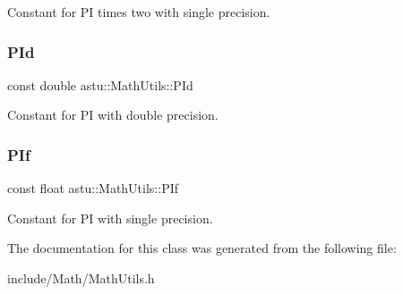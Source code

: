 Constant for PI times two with single precision. \mbox{\label{classastu_1_1MathUtils_a333f618d0f2a07c78ebddfcecc2dca2f}} 
\subsubsection{\texorpdfstring{P\+Id}{PId}}
{\footnotesize\ttfamily const double astu\+::\+Math\+Utils\+::\+P\+Id\hspace{0.3cm}{\ttfamily [static]}}

Constant for PI with double precision. \mbox{\label{classastu_1_1MathUtils_a77d9d18581e2eb6aa0f3b79f455a9ed0}} 
\subsubsection{\texorpdfstring{P\+If}{PIf}}
{\footnotesize\ttfamily const float astu\+::\+Math\+Utils\+::\+P\+If\hspace{0.3cm}{\ttfamily [static]}}

Constant for PI with single precision. 

The documentation for this class was generated from the following file\+:\begin{DoxyCompactItemize}
\item 
include/\+Math/Math\+Utils.\+h\end{DoxyCompactItemize}
